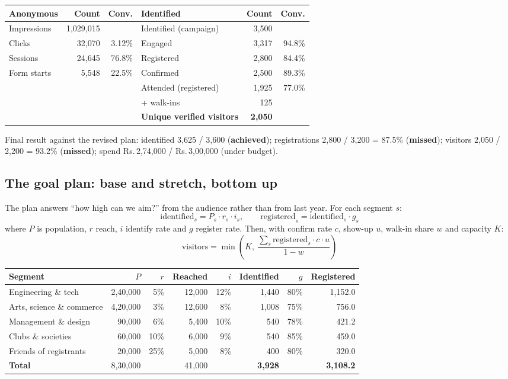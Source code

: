 \documentclass[11pt,a4paper]{article}
\newcommand{\rs}{Rs.\,}
\begin{document}
\begin{center}\small
\begin{tabular}{@{}lrr@{\hspace{2.4em}}lrr@{}}
\toprule
\textbf{Anonymous} & \textbf{Count} & \textbf{Conv.} & \textbf{Identified} & \textbf{Count} & \textbf{Conv.} \\
\midrule
Impressions & 1,029,015 & & Identified (campaign) & 3,500 & \\
Clicks & 32,070 & 3.12\% & Engaged & 3,317 & 94.8\% \\
Sessions & 24,645 & 76.8\% & Registered & 2,800 & 84.4\% \\
Form starts & 5,548 & 22.5\% & Confirmed & 2,500 & 89.3\% \\
 & & & Attended (registered) & 1,925 & 77.0\% \\
 & & & + walk-ins & 125 & \\
 & & & \textbf{Unique verified visitors} & \textbf{2,050} & \\
\bottomrule
\end{tabular}
\end{center}

Final result against the revised plan: identified 3,625 / 3,600 (\textbf{achieved}); registrations 2,800 / 3,200 = 87.5\% (\textbf{missed}); visitors 2,050 / 2,200 = 93.2\% (\textbf{missed}); spend \rs2,74,000 / \rs3,00,000 (under budget).

\subsection{The goal plan: base and stretch, bottom up}\label{sec:calc-plan}
The plan answers ``how high can we aim?'' from the audience rather than from last year. For each segment $s$:
\[
\text{identified}_s = P_s \cdot r_s \cdot i_s,\qquad
\text{registered}_s = \text{identified}_s \cdot g_s
\]
where $P$ is population, $r$ reach, $i$ identify rate and $g$ register rate. Then, with confirm rate $c$, show-up $u$, walk-in share $w$ and capacity $K$:
\[
\text{visitors} = \min\!\left(K,\ \frac{\sum_s \text{registered}_s \cdot c \cdot u}{1-w}\right)
\]

\begin{center}\small
\begin{tabular}{@{}lrrrrrrr@{}}
\toprule
\textbf{Segment} & $P$ & $r$ & \textbf{Reached} & $i$ & \textbf{Identified} & $g$ & \textbf{Registered} \\
\midrule
Engineering \& tech & 2,40,000 & 5\% & 12,000 & 12\% & 1,440 & 80\% & 1,152.0 \\
Arts, science \& commerce & 4,20,000 & 3\% & 12,600 & 8\% & 1,008 & 75\% & 756.0 \\
Management \& design & 90,000 & 6\% & 5,400 & 10\% & 540 & 78\% & 421.2 \\
Clubs \& societies & 60,000 & 10\% & 6,000 & 9\% & 540 & 85\% & 459.0 \\
Friends of registrants & 20,000 & 25\% & 5,000 & 8\% & 400 & 80\% & 320.0 \\
\midrule
\textbf{Total} & 8,30,000 & & 41,000 & & \textbf{3,928} & & \textbf{3,108.2} \\
\bottomrule
\end{tabular}
\end{center}
\end{document}
